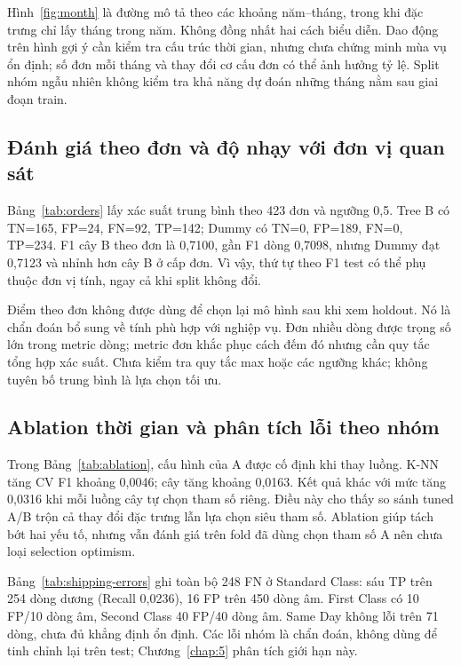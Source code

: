 Hình~\ref{fig:month} là đường mô tả theo các khoảng năm--tháng, trong khi
đặc trưng  chỉ lấy tháng trong năm. Không đồng nhất hai
cách biểu diễn. Dao động trên hình gợi ý cần kiểm tra cấu trúc thời gian,
nhưng chưa chứng minh mùa vụ ổn định; số đơn mỗi tháng và thay đổi cơ cấu
đơn có thể ảnh hưởng tỷ lệ. Split nhóm ngẫu nhiên không kiểm tra khả năng
dự đoán những tháng nằm sau giai đoạn train.

\subsection{Đánh giá theo đơn và độ nhạy với đơn vị quan sát}

Bảng~\ref{tab:orders} lấy xác suất trung bình theo 423 đơn và ngưỡng 0,5.
Tree B có TN=165, FP=24, FN=92, TP=142; Dummy có TN=0, FP=189, FN=0,
TP=234. F1 cây B theo đơn là 0,7100, gần F1 dòng 0,7098, nhưng Dummy
đạt 0,7123 và nhỉnh hơn cây B ở cấp đơn. Vì vậy, thứ tự theo F1 test có
thể phụ thuộc đơn vị tính, ngay cả khi split không đổi.

Điểm theo đơn không được dùng để chọn lại mô hình sau khi xem holdout.
Nó là chẩn đoán bổ sung về tính phù hợp với nghiệp vụ. Đơn nhiều dòng
được trọng số lớn trong metric dòng; metric đơn khắc phục cách đếm đó
nhưng cần quy tắc tổng hợp xác suất. Chưa kiểm tra quy tắc max hoặc các
ngưỡng khác; không tuyên bố trung bình là lựa chọn tối ưu.

\subsection{Ablation thời gian và phân tích lỗi theo nhóm}

Trong Bảng~\ref{tab:ablation}, cấu hình của A được cố định khi thay luồng.
K-NN tăng CV F1 khoảng 0,0046; cây tăng khoảng 0,0163. Kết quả khác với
mức tăng 0,0316 khi mỗi luồng cây tự chọn tham số riêng. Điều này cho
thấy so sánh tuned A/B trộn cả thay đổi đặc trưng lẫn lựa chọn siêu tham
số. Ablation giúp tách bớt hai yếu tố, nhưng vẫn đánh giá trên fold đã
dùng chọn tham số A nên chưa loại selection optimism.


\begin{samepage}
Bảng~\ref{tab:shipping-errors} ghi toàn bộ 248 FN ở Standard Class: sáu TP
trên 254 dòng dương (Recall 0,0236), 16 FP trên 450 dòng âm. First Class
có 10 FP/10 dòng âm, Second Class 40 FP/40 dòng âm. Same Day không lỗi
trên 71 dòng, chưa đủ khẳng định ổn định. Các lỗi nhóm là chẩn đoán,
không dùng để tinh chỉnh lại trên test; Chương~\ref{chap:5} phân tích giới hạn này.
\par\end{samepage}
